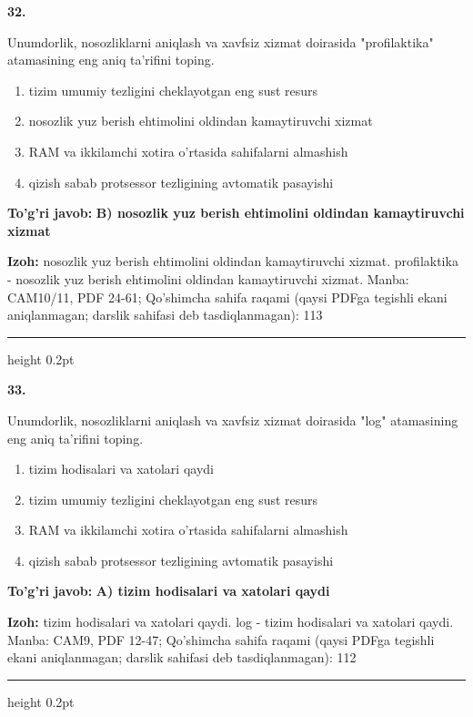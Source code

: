 \documentclass[10pt,a4paper]{article}
\begin{document}
{\bfseries\sffamily\color{ink} 32.}
\par
Unumdorlik, nosozliklarni aniqlash va xavfsiz xizmat doirasida "profilaktika" atamasining eng aniq ta'rifini toping.
\begin{enumerate}[label=\Alph*),leftmargin=9mm]
\item tizim umumiy tezligini cheklayotgan eng sust resurs
\item nosozlik yuz berish ehtimolini oldindan kamaytiruvchi xizmat
\item RAM va ikkilamchi xotira o'rtasida sahifalarni almashish
\item qizish sabab protsessor tezligining avtomatik pasayishi
\end{enumerate}
\begin{tcolorbox}[enhanced,breakable,colback=teal!4,colframe=teal!60!black,boxrule=0.45pt,arc=1.2mm,left=2.7mm,right=2.7mm,top=1.8mm,bottom=1.8mm,before skip=2mm,after skip=2mm]
{\bfseries\sffamily\color{teal}To'g'ri javob:} \textbf{B) nosozlik yuz berish ehtimolini oldindan kamaytiruvchi xizmat}
\par\smallskip
{\bfseries Izoh:} nosozlik yuz berish ehtimolini oldindan kamaytiruvchi xizmat. profilaktika - nosozlik yuz berish ehtimolini oldindan kamaytiruvchi xizmat. Manba: CAM10/11, PDF 24-61; Qo'shimcha sahifa raqami (qaysi PDFga tegishli ekani aniqlanmagan; darslik sahifasi deb tasdiqlanmagan): 113
\end{tcolorbox}
\vspace{2mm}\hrule height 0.2pt\vspace{3mm}

{\bfseries\sffamily\color{ink} 33.}
\par
Unumdorlik, nosozliklarni aniqlash va xavfsiz xizmat doirasida "log" atamasining eng aniq ta'rifini toping.
\begin{enumerate}[label=\Alph*),leftmargin=9mm]
\item tizim hodisalari va xatolari qaydi
\item tizim umumiy tezligini cheklayotgan eng sust resurs
\item RAM va ikkilamchi xotira o'rtasida sahifalarni almashish
\item qizish sabab protsessor tezligining avtomatik pasayishi
\end{enumerate}
\begin{tcolorbox}[enhanced,breakable,colback=teal!4,colframe=teal!60!black,boxrule=0.45pt,arc=1.2mm,left=2.7mm,right=2.7mm,top=1.8mm,bottom=1.8mm,before skip=2mm,after skip=2mm]
{\bfseries\sffamily\color{teal}To'g'ri javob:} \textbf{A) tizim hodisalari va xatolari qaydi}
\par\smallskip
{\bfseries Izoh:} tizim hodisalari va xatolari qaydi. log - tizim hodisalari va xatolari qaydi. Manba: CAM9, PDF 12-47; Qo'shimcha sahifa raqami (qaysi PDFga tegishli ekani aniqlanmagan; darslik sahifasi deb tasdiqlanmagan): 112
\end{tcolorbox}
\vspace{2mm}\hrule height 0.2pt\vspace{3mm}
\end{document}
